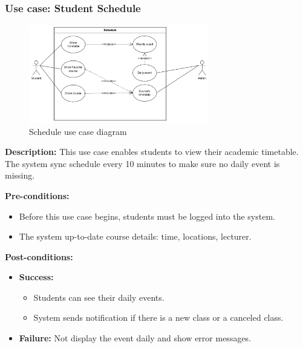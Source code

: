 \documentclass{article}
\begin{document}
\subsubsection{Use case: Student Schedule}
    \begin{figure}[H]
        \centering
        \includegraphics[width=0.7\textwidth]{image/StudentScheduleUseCase.drawio.png} 
        \caption{Schedule use case diagram}
        \label{fig:schedule_use_case}
    \end{figure}
    \textbf{Description:} This use case enables students to view their academic timetable. The system sync schedule every 10 minutes to make sure no daily event is missing.

    \noindent \textbf{Pre-conditions:} 
        \begin{itemize}
            \item Before this use case begins, students must be logged into the system.
            \item The system up-to-date course details: time, locations, lecturer.
        \end{itemize}
    \noindent \textbf{Post-conditions:}
    \begin{itemize}
        \item \textbf{Success:} 
        \begin{itemize}
            \item Students can see their daily events.
            \item System sends notification if there is a new class or a canceled class.
        \end{itemize}
        \item \textbf{Failure:} Not display the event daily and show error messages.
    \end{itemize}
\end{document}

